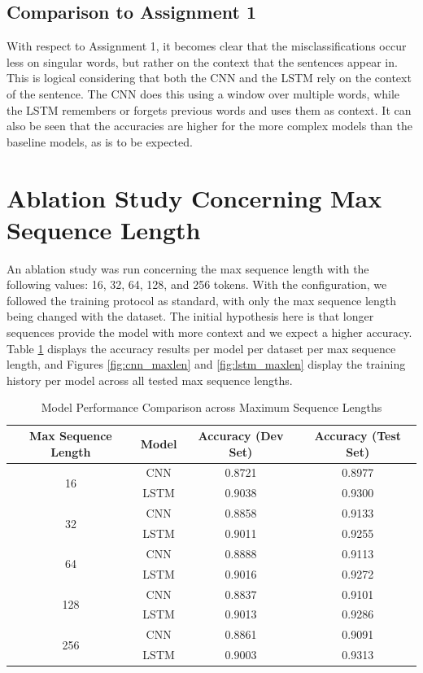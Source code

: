\documentclass[12pt,a4paper,english]{article}
\begin{document}
\subsection{Comparison to Assignment 1}
With respect to Assignment 1, it becomes clear that the misclassifications occur less on singular words, but rather on the context that the sentences appear in. This is logical considering that both the CNN and the LSTM rely on the context of the sentence. The CNN does this using a window over multiple words, while the LSTM remembers or forgets previous words and uses them as context. It can also be seen that the accuracies are higher for the more complex models than the baseline models, as is to be expected. 

\section{Ablation Study Concerning Max Sequence Length}

An ablation study was run concerning the max sequence length with the following values: 16, 32, 64, 128, and 256 tokens. With the configuration, we followed the training protocol as standard, with only the max sequence length being changed with the dataset. The initial hypothesis here is that longer sequences provide the model with more context and we expect a higher accuracy. Table \ref{tab:seq_length_comparison} displays the accuracy results per model per dataset per max sequence length, and Figures \ref{fig:cnn_maxlen} and \ref{fig:lstm_maxlen} display the training history per model across all tested max sequence lengths. 

\begin{table}[h]
    \centering
    \begin{tabular}{|c|c|c|c|}
        \hline
        \textbf{Max Sequence Length} & \textbf{Model} & \textbf{Accuracy (Dev Set)} & \textbf{Accuracy (Test Set)} \\ \hline
        \multirow{2}{*}{16}  & CNN  & 0.8721 & 0.8977 \\ \cline{2-4} 
                             & LSTM & 0.9038 & 0.9300 \\ \hline
        \multirow{2}{*}{32}  & CNN  & 0.8858 & 0.9133 \\ \cline{2-4} 
                             & LSTM & 0.9011 & 0.9255 \\ \hline
        \multirow{2}{*}{64}  & CNN  & 0.8888 & 0.9113 \\ \cline{2-4} 
                             & LSTM & 0.9016 & 0.9272 \\ \hline
        \multirow{2}{*}{128} & CNN  & 0.8837 & 0.9101 \\ \cline{2-4} 
                             & LSTM & 0.9013 & 0.9286 \\ \hline
        \multirow{2}{*}{256} & CNN  & 0.8861 & 0.9091 \\ \cline{2-4} 
                             & LSTM & 0.9003 & 0.9313 \\ \hline
    \end{tabular}
    \caption{Model Performance Comparison across Maximum Sequence Lengths}
    \label{tab:seq_length_comparison}
\end{table}
\end{document}
